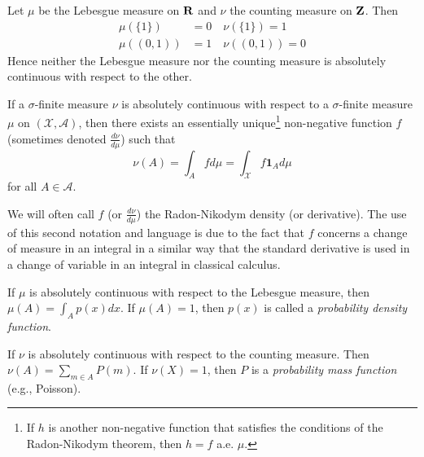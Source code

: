 \documentclass[twoside]{article}
\begin{document}
\begin{example}  Let $\mu$ be the Lebesgue measure on $\mathbf{R}$ and $\nu$ the counting
  measure on $\mathbf{Z}$.  Then
  \begin{align*}
    \mu(\{1\}) &= 0 \quad \nu(\{1\}) = 1 \\
    \mu((0, 1)) &= 1 \quad \nu((0, 1)) = 0
  \end{align*}
  Hence neither the Lebesgue measure nor the counting measure is absolutely continuous
  with respect to the other.
\end{example}

\begin{theorem}\citep[Def. 1.10, p.~7]{keener}
  If a $\sigma$-finite measure $\nu$ is absolutely continuous with respect to a
  $\sigma$-finite measure $\mu$ on $(\mathcal X, \mathcal A)$, then there exists
  an essentially unique\footnote{If $h$ is
  another non-negative function that satisfies the conditions of the
  Radon-Nikodym theorem, then $h=f$ a.e. $\mu$.} non-negative function $f$
  (sometimes denoted $\frac{d\nu}{d\mu}$) such that
  \[\nu(A) = \int_A f d\mu = \int_{\mathcal X} f \mathbf{1}_A d\mu\]
  for all $A \in \mathcal A$.
\end{theorem}

We will often call $f$ (or $\frac{d\nu}{d\mu}$) the Radon-Nikodym density (or
derivative).  The use of this second notation and language is due to the fact
that $f$ concerns a change of measure in an integral in a similar way that the
standard derivative is used in a change of variable in an integral in classical
calculus. 

\begin{example}
  If $\mu$ is absolutely continuous with respect to the Lebesgue measure,
  then $\mu(A) = \int_A p(x) dx$.  If $\mu(A) =
  1$, then $p(x)$ is called a \emph{probability density function}.
\end{example}

\begin{example}
  If $\nu$ is absolutely continuous with respect to the counting measure. Then
  $\nu(A) = \sum_{m \in A} P(m)$.  If $\nu(X) = 1$, then $P$ is a
  \emph{probability mass function} (e.g., Poisson).
\end{example}
\end{document}
